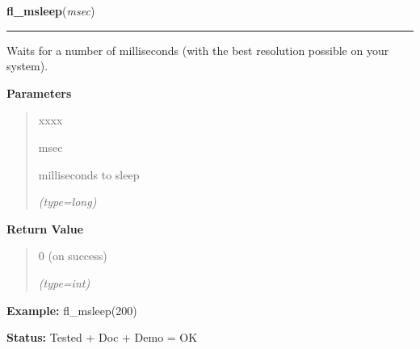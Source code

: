 \hspace{.8\funcindent}\begin{boxedminipage}{\funcwidth}

    \raggedright \textbf{fl\_msleep}(\textit{msec})

    \vspace{-1.5ex}

    \rule{\textwidth}{0.5\fboxrule}
\setlength{\parskip}{2ex}
    Waits for a number of milliseconds (with the best resolution possible 
    on your system).

\setlength{\parskip}{1ex}
      \textbf{Parameters}
      \vspace{-1ex}

      \begin{quote}
        \begin{Ventry}{xxxx}

          \item[msec]

          milliseconds to sleep

            {\it (type=long)}

        \end{Ventry}

      \end{quote}

      \textbf{Return Value}
    \vspace{-1ex}

      \begin{quote}
      0 (on success)

      {\it (type=int)}

      \end{quote}

\textbf{Example:} fl\_msleep(200)



\textbf{Status:} Tested + Doc + Demo = OK



    \end{boxedminipage}

    \label{xformslib:flbasic:fl_is_same_object}

    \vspace{0.5ex}


